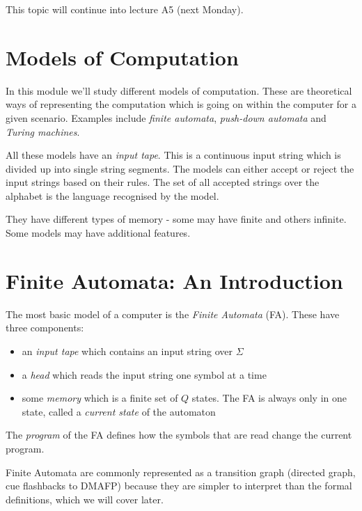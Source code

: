 
This topic will continue into lecture A5 (next Monday).

\section{Models of Computation}
In this module we'll study different models of computation. These are theoretical ways of representing the computation which is going on within the computer for a given scenario. Examples include \textit{finite automata}, \textit{push-down automata} and \textit{Turing machines}. 

All these models have an \textit{input tape}. This is a continuous input string which is divided up into single string segments. The models can either accept or reject the input strings based on their rules. The set of all accepted strings over the alphabet is the language recognised by the model.

They have different types of memory - some may have finite and others infinite. Some models may have additional features.

\section{Finite Automata: An Introduction}
The most basic model of a computer is the \textit{Finite Automata} (FA). These have three components:
\begin{itemize}
    \item an \textit{input tape} which contains an input string over $\Sigma$
    \item a \textit{head} which reads the input string one symbol at a time
    \item some \textit{memory} which is a finite set of $Q$ states. The FA is always only in one state, called a \textit{current state} of the automaton
\end{itemize}

The \textit{program} of the FA defines how the symbols that are read change the current program.

Finite Automata are commonly represented as a transition graph (directed graph, cue flashbacks to DMAFP) because they are simpler to interpret than the formal definitions, which we will cover later.


